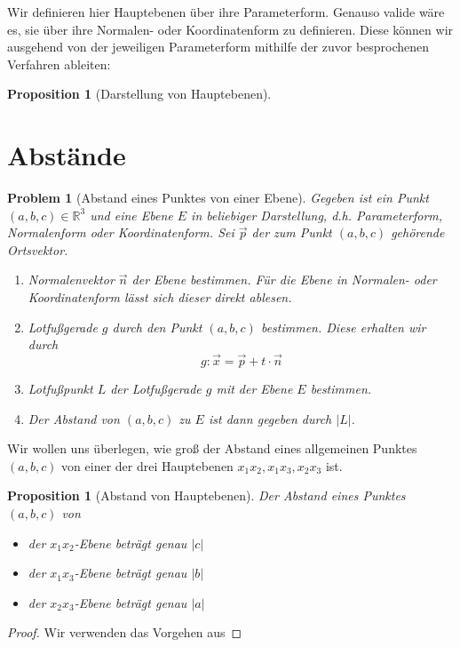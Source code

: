 \documentclass[11pt,reqno, a4paper]{book}
\theoremstyle{mystyle}
\newtheorem{proposition}[theorem]{Proposition}
\newtheorem{problem}[theorem]{Problem}
\theoremstyle{definition}
\numberwithin{equation}{chapter}
\begin{document}
Wir definieren hier Hauptebenen über ihre Parameterform. Genauso valide wäre es, sie über ihre Normalen- oder Koordinatenform zu definieren. Diese können wir ausgehend von der jeweiligen Parameterform mithilfe der zuvor besprochenen Verfahren ableiten: 

\begin{proposition}[Darstellung von Hauptebenen]
    
\end{proposition}

\section{Abstände}

\begin{problem}[Abstand eines Punktes von einer Ebene] Gegeben ist ein Punkt \((a,b,c)\in \mathbb R^3\) und eine Ebene \(E\) in beliebiger Darstellung, d.h. Parameterform, Normalenform oder Koordinatenform. Sei \(\vec p\) der zum Punkt \((a,b,c)\) gehörende Ortsvektor. 
\begin{enumerate}
    \item Normalenvektor \(\vec n\) der Ebene bestimmen. Für die Ebene in Normalen- oder Koordinatenform lässt sich dieser direkt ablesen. 
    \item Lotfußgerade \(g\) durch den Punkt \((a,b,c)\) bestimmen. Diese erhalten wir durch 
    \begin{equation*}
        g: \vec x = \vec p + t\cdot \vec n
    \end{equation*}
    \item Lotfußpunkt \(L\) der Lotfußgerade \(g\) mit der Ebene \(E\) bestimmen. 
    \item Der Abstand von \((a,b,c)\) zu \(E\) ist dann gegeben durch \(|L|\). 
\end{enumerate}
    
\end{problem}

Wir wollen uns überlegen, wie groß der Abstand eines allgemeinen Punktes \((a,b,c)\) von einer der drei Hauptebenen \(x_1x_2, x_1x_3,x_2x_3\) ist.
\begin{proposition}[Abstand von Hauptebenen]
    Der Abstand eines Punktes \((a,b,c)\) von 
    \begin{itemize}
        \item der \(x_1x_2\)-Ebene beträgt genau \(|c|\)
        \item der \(x_1x_3\)-Ebene beträgt genau \(|b|\)
        \item der \(x_2x_3\)-Ebene beträgt genau \(|a|\)
    \end{itemize}
\end{proposition}
\begin{proof}
    Wir verwenden das Vorgehen aus 
\end{proof}
\end{document}
